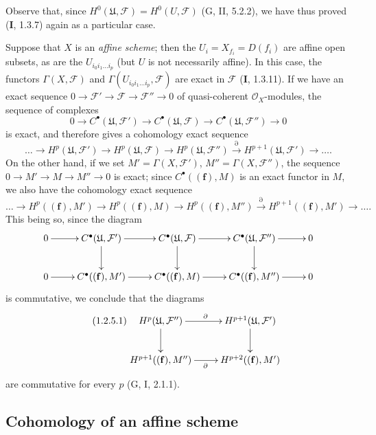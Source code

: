 Observe that, since
$H^0(\mathfrak U,\mathcal F)=H^0(U,\mathcal F)$ (G, II, 5.2.2), we have thus
proved (\textbf{I}, 1.3.7) again as a particular case.

\begin{remark}[1.2.5]
\label{III.1.2.5}
Suppose that $X$ is an \emph{affine scheme}; then the
$U_i=X_{f_i}=D(f_i)$ are affine open subsets, as are the
$U_{i_0i_1\ldots i_p}$ (but $U$ is not necessarily affine). In this
case, the functors $\Gamma(X,\mathcal F)$ and
$\Gamma(U_{i_0i_1\ldots i_p},\mathcal F)$ are exact in $\mathcal F$
(\textbf{I}, 1.3.11). If we have an exact sequence
$0\to\mathcal F'\to\mathcal F\to\mathcal F''\to0$ of quasi-coherent
$\mathcal O_X$-modules, the sequence of complexes
\[
0\longrightarrow C^\bullet(\mathfrak U,\mathcal F')
\longrightarrow C^\bullet(\mathfrak U,\mathcal F)
\longrightarrow C^\bullet(\mathfrak U,\mathcal F'')
\longrightarrow0
\]
is exact, and therefore gives a cohomology exact sequence
\[
\ldots\longrightarrow H^p(\mathfrak U,\mathcal F')
\longrightarrow H^p(\mathfrak U,\mathcal F)
\longrightarrow H^p(\mathfrak U,\mathcal F'')
\xrightarrow{\partial}H^{p+1}(\mathfrak U,\mathcal F')
\longrightarrow\ldots.
\]
On the other hand, if we set $M'=\Gamma(X,\mathcal F')$,
$M''=\Gamma(X,\mathcal F'')$, the sequence
$0\to M'\to M\to M''\to0$ is exact; since
$C^\bullet((\mathbf f),M)$ is an exact functor in $M$, we also have the
cohomology exact sequence
\[
\ldots\longrightarrow H^p((\mathbf f),M')
\longrightarrow H^p((\mathbf f),M)
\longrightarrow H^p((\mathbf f),M'')
\xrightarrow{\partial}H^{p+1}((\mathbf f),M')
\longrightarrow\ldots.
\]
This being so, since the diagram
\[
\xymatrix{
0\ar[r]&C^\bullet(\mathfrak U,\mathcal F')\ar[r]\ar[d]
&C^\bullet(\mathfrak U,\mathcal F)\ar[r]\ar[d]
&C^\bullet(\mathfrak U,\mathcal F'')\ar[r]\ar[d]&0\\
0\ar[r]&C^\bullet((\mathbf f),M')\ar[r]
&C^\bullet((\mathbf f),M)\ar[r]
&C^\bullet((\mathbf f),M'')\ar[r]&0
}
\]
is commutative, we conclude that the diagrams
\begin{equation}
\label{III.1.2.5.1}
\tag{1.2.5.1}
\xymatrix{
H^p(\mathfrak U,\mathcal F'')\ar[r]^{\partial}\ar[d]
&H^{p+1}(\mathfrak U,\mathcal F')\ar[d]\\
H^{p+1}((\mathbf f),M'')\ar[r]_{\partial}
&H^{p+2}((\mathbf f),M')
}
\end{equation}
are commutative for every $p$ (G, I, 2.1.1).
\end{remark}

\subsection{Cohomology of an affine scheme}
\label{subsection:III.1.3}

